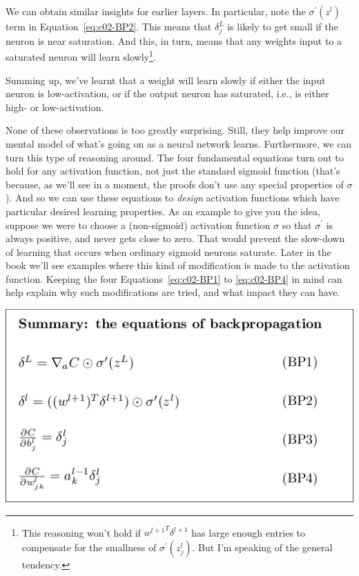 We can obtain similar insights for earlier layers. In particular, note the $\sigma^{\prime}\left(z^{l}\right)$
term in Equation~\ref{eq:c02-BP2}. This means that $\delta_{j}^{L}$ is likely to get small if the neuron is near saturation. And this, in turn, means that any weights input to a saturated neuron will learn slowly\footnote{This reasoning won't hold if ${w^{l+1}}^T\delta^{l+1}$ has large enough entries to compensate for the smallness of $\sigma^\prime(z^l_j)$. But I'm speaking of the general tendency.}.

Summing up, we've learnt that a weight will learn slowly if either the input neuron is low-activation, or if the output neuron has saturated, i.e., is either high- or low-activation. 

None of these observations is too greatly surprising. Still, they help improve our mental model of what's going on as a neural network learns. Furthermore, we can turn this type of reasoning around. The four fundamental equations turn out to hold for any activation function, not just the standard sigmoid function (that's because, as we'll see in a moment, the proofs don't use any special properties of $\sigma$). And so we can use these equations to \textit{design} activation functions which have particular desired learning properties. As an example to give you the idea, suppose we were to choose a (non-sigmoid) activation function $\sigma$ so that  $\sigma^\prime$ is always positive, and never gets close to zero. That would prevent the slow-down of learning that occurs when ordinary sigmoid neurons saturate. Later in the book we'll see examples where this kind of modification is made to the activation function. Keeping the four Equations~\ref{eq:c02-BP1} to \ref{eq:c02-BP4} in mind can help explain why such modifications are tried, and what impact they can have.

{\centering \includegraphics[width=\textwidth,]{pic/tikz21.png} \par}

